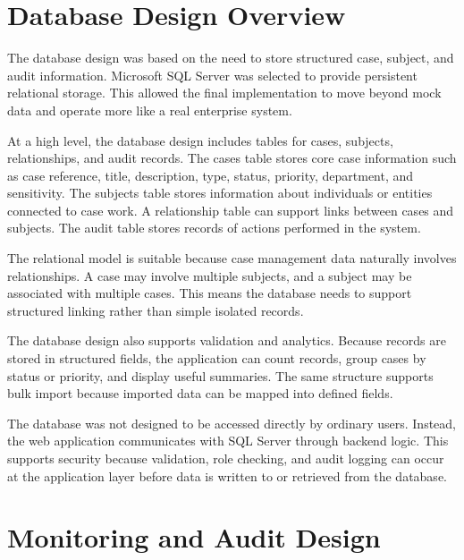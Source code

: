 
\section{Database Design Overview}


The database design was based on the need to store structured case, subject, and audit information. Microsoft SQL Server was selected to provide persistent relational storage. This allowed the final implementation to move beyond mock data and operate more like a real enterprise system.

At a high level, the database design includes tables for cases, subjects, relationships, and audit records. The cases table stores core case information such as case reference, title, description, type, status, priority, department, and sensitivity. The subjects table stores information about individuals or entities connected to case work. A relationship table can support links between cases and subjects. The audit table stores records of actions performed in the system.

The relational model is suitable because case management data naturally involves relationships. A case may involve multiple subjects, and a subject may be associated with multiple cases. This means the database needs to support structured linking rather than simple isolated records.

The database design also supports validation and analytics. Because records are stored in structured fields, the application can count records, group cases by status or priority, and display useful summaries. The same structure supports bulk import because imported data can be mapped into defined fields.

The database was not designed to be accessed directly by ordinary users. Instead, the web application communicates with SQL Server through backend logic. This supports security because validation, role checking, and audit logging can occur at the application layer before data is written to or retrieved from the database.


\section{Monitoring and Audit Design}

